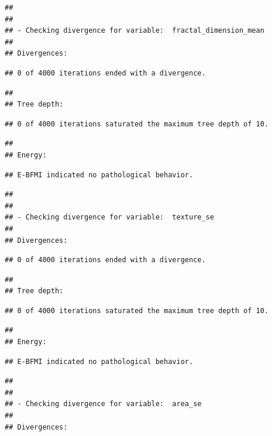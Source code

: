 \documentclass[
]{article}
\begin{document}
\begin{verbatim}
## 
## 
## - Checking divergence for variable:  fractal_dimension_mean 
## 
## Divergences:
\end{verbatim}

\begin{verbatim}
## 0 of 4000 iterations ended with a divergence.
\end{verbatim}

\begin{verbatim}
## 
## Tree depth:
\end{verbatim}

\begin{verbatim}
## 0 of 4000 iterations saturated the maximum tree depth of 10.
\end{verbatim}

\begin{verbatim}
## 
## Energy:
\end{verbatim}

\begin{verbatim}
## E-BFMI indicated no pathological behavior.
\end{verbatim}

\begin{verbatim}
## 
## 
## - Checking divergence for variable:  texture_se 
## 
## Divergences:
\end{verbatim}

\begin{verbatim}
## 0 of 4000 iterations ended with a divergence.
\end{verbatim}

\begin{verbatim}
## 
## Tree depth:
\end{verbatim}

\begin{verbatim}
## 0 of 4000 iterations saturated the maximum tree depth of 10.
\end{verbatim}

\begin{verbatim}
## 
## Energy:
\end{verbatim}

\begin{verbatim}
## E-BFMI indicated no pathological behavior.
\end{verbatim}

\begin{verbatim}
## 
## 
## - Checking divergence for variable:  area_se 
## 
## Divergences:
\end{verbatim}
\end{document}
